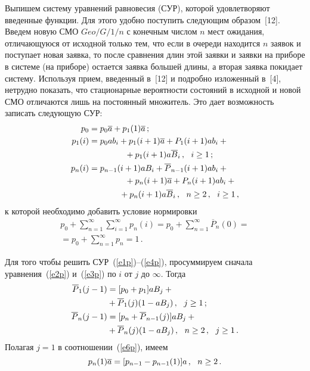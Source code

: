 \begin{multicols}{2}
Выпишем систему уравнений равновесия (СУР), которой
удовлетворяют введенные функции.
Для этого удобно поступить следующим образом~[12].
Введем новую СМО $Geo/G/1/n$ с конечным числом $n$ мест
ожидания, отличающуюся от исходной только тем, что если
в очереди находится $n$ заявок и поступает новая заявка,
то после сравнения длин этой заявки и заявки на приборе
в системе (на приборе) остается заявка большей
длины, а вторая заявка покидает систему.
Используя прием, введенный в~[12] и подробно изложенный
в~[4], нетрудно показать, что стационарные вероятности
состояний в исходной и новой СМО отличаются лишь на
постоянный множитель.
Это дает возможность записать следующую СУР:
\begin{align}
p_{0} &= p_{0} \a + p_{1}(1) \a\,; \label{e1p}\\
p_{1}(i) & = p_{0} a b_i + p_{1}(i+1) \a + P_{1}(i+1) a b_i +{}\notag\\
&\ \ \ \ \ \ \ \ \ \ \ \ \ {}+ p_{1}(i+1) a \overline B_i\,, \ \ i\ge 1\,; \label{e2p} \\
p_{n}(i) & = p_{n-1}(i+1) a B_i + \overline P_{n-1}(i+1) a b_i +{}\notag\\
&\ \ \ \ \ \ \ \ \ \ \ \ \ {}+ p_{n}(i+1) \a + P_{n}(i+1) a b_i +{}\notag\\
&\ \ \ \ \ \ \ \ \ \ \ {}+ p_{n}(i+1) a \overline B_i\,,
\ \ n\ge 2\,,\ \ i\ge 1\,, \label{e3p}
\end{align}
к которой необходимо добавить условие норми\-ровки
\begin{multline}
p_0 + \sum\limits_{n=1}^\infty \sum\limits_{i=1}^\infty
p_n(i) = p_0 + \sum\limits_{n=1}^\infty \overline P_{n}(0) ={}\\
{}=p_0 + \sum\limits_{n=1}^\infty p_{n} = 1\,. \label{e4p}
\end{multline}

Для того чтобы решить СУР~(\ref{e1p})--(\ref{e4p}), просуммируем
сначала уравнения~(\ref{e2p}) и~(\ref{e3p}) по $i$ от $j$ до $\infty$.
Тогда
\begin{align}
\overline P_1(j-1) &= [p_0 + p_1]aB_j +{}\notag\\
&{}+ \overline P_{1}(j) (1-a B_{j})\,,
\ \ j\ge 1\,; \label{e5p}\\
\overline P_n(j-1) & = [p_n + \overline P_{n-1}(j)] a B_j +{}\notag\\
&{}+
\overline P_{n}(j) (1-a B_{j})\,,  \ \ n\ge 2\,,\ \ j\ge 1\,.   \label{e6p}
\end{align}
Полагая $j=1$ в соотношении~(\ref{e6p}), имеем
\begin{equation}
p_n(1) \overline a = [p_{n-1} - p_{n-1}(1)] a\,, \ \ n\ge 2\,.    
\label{e7p}
\end{equation}


\end{multicols}
